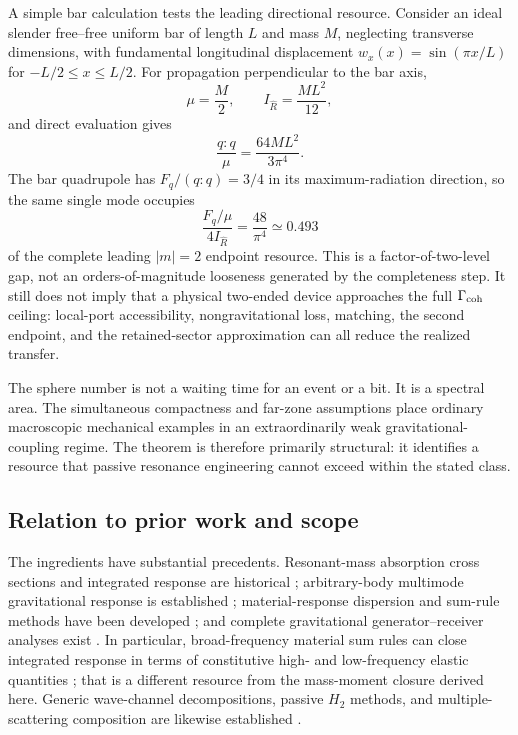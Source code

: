 A simple bar calculation tests the leading directional resource. Consider an ideal slender free--free uniform bar of length $L$ and mass $M$, neglecting transverse dimensions, with fundamental longitudinal displacement $w_x(x)=\sin(\pi x/L)$ for $-L/2\le x\le L/2$. For propagation perpendicular to the bar axis,
\begin{equation}
\mu=\frac{M}{2},\qquad
I_{\hat R}=\frac{ML^2}{12},
\end{equation}
and direct evaluation gives
\begin{equation}
\frac{q:q}{\mu}=\frac{64ML^2}{3\pi^4}.
\end{equation}
The bar quadrupole has $F_q/(q:q)=3/4$ in its maximum-radiation direction, so the same single mode occupies
\begin{equation}
\boxed{
\frac{F_q/\mu}{4I_{\hat R}}
=\frac{48}{\pi^4}
\simeq0.493
}
\label{eq:barfraction}
\end{equation}
of the complete leading $|m|=2$ endpoint resource. This is a factor-of-two-level gap, not an orders-of-magnitude looseness generated by the completeness step. It still does not imply that a physical two-ended device approaches the full $\Gamma_{\rm coh}$ ceiling: local-port accessibility, nongravitational loss, matching, the second endpoint, and the retained-sector approximation can all reduce the realized transfer.

The sphere number is not a waiting time for an event or a bit. It is a spectral area. The simultaneous compactness and far-zone assumptions place ordinary macroscopic mechanical examples in an extraordinarily weak gravitational-coupling regime. The theorem is therefore primarily structural: it identifies a resource that passive resonance engineering cannot exceed within the stated class.

\subsection{Relation to prior work and scope}

The ingredients have substantial precedents. Resonant-mass absorption cross sections and integrated response are historical \cite{PaikWagoner1976,Aguiar2011}; arbitrary-body multimode gravitational response is established \cite{Lobo1995}; material-response dispersion and sum-rule methods have been developed \cite{Srivastava2003}; and complete gravitational generator--receiver analyses exist \cite{Rudenko2003}. In particular, broad-frequency material sum rules can close integrated response in terms of constitutive high- and low-frequency elastic quantities \cite{Srivastava2003}; that is a different resource from the mass-moment closure derived here. Generic wave-channel decompositions, passive $H_2$ methods, and multiple-scattering composition are likewise established \cite{Miller2000,Molesky2020,BarasBrockett1975,Opmeer2013,Redheffer1962}.

